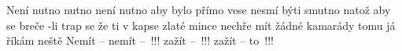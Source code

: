 \begin{TEXT}{Není nutno}
\SLOKA {} nutno není nutno aby bylo přímo vese \NL
{} nesmí býti smutno natož aby se breče  \NL
{}-li trap se že ti v kapse zlaté mince nechře \NL
{}mít žádné kamarády tomu já říkám neště 
\REFREN  Nemít  --  \NL
nemít  -- \,!!! \NL
zažít  -- \,!!! \NL
zažít  --  to \,!!! \NL
\end{TEXT}
